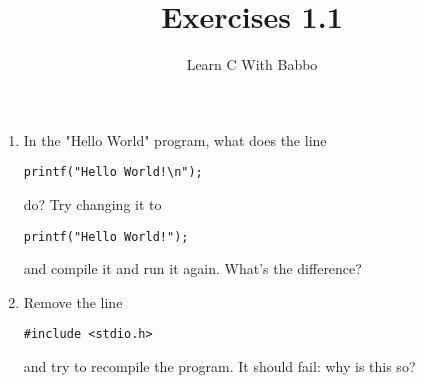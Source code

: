 \documentclass{article}
\begin{document}
\title{Exercises 1.1}
\author{Learn C With Babbo}
\date{}
\maketitle

\begin{enumerate}
\item In the "Hello World" program, what does the line \\
\begin{lstlisting}[style=CStyle]
printf("Hello World!\n");
\end{lstlisting}
do? Try changing it to \\
\begin{lstlisting}[style=CStyle]
printf("Hello World!");
\end{lstlisting}
and compile it and run it again. What's the difference?
\item
Remove the line \\
\begin{lstlisting}[style=CStyle]
#include <stdio.h>
\end{lstlisting}
and try to recompile the program. It should fail: why is this so?

\end{enumerate}
\end{document}
